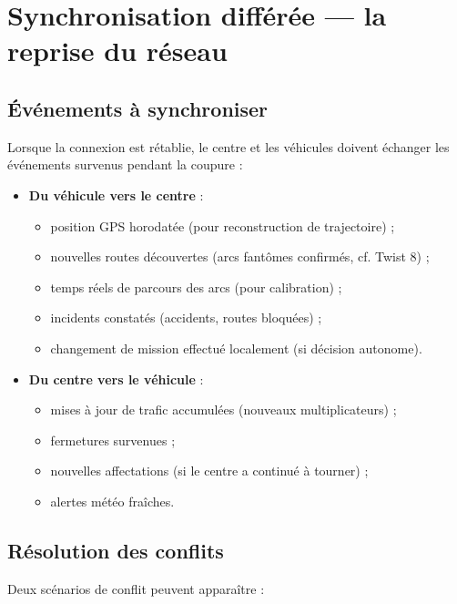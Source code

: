 \documentclass[12pt,a4paper]{article}
\theoremstyle{definition}
\theoremstyle{remark}
\begin{document}
\newpage

\section{Synchronisation différée — la reprise du réseau}

\subsection{Événements à synchroniser}

Lorsque la connexion est rétablie, le centre et les véhicules
doivent échanger les événements survenus pendant la coupure :

\begin{itemize}
  \item \textbf{Du véhicule vers le centre} :
    \begin{itemize}
      \item position GPS horodatée (pour reconstruction de trajectoire) ;
      \item nouvelles routes découvertes (arcs fantômes confirmés,
            cf. Twist 8) ;
      \item temps réels de parcours des arcs (pour calibration) ;
      \item incidents constatés (accidents, routes bloquées) ;
      \item changement de mission effectué localement (si décision autonome).
    \end{itemize}
  \item \textbf{Du centre vers le véhicule} :
    \begin{itemize}
      \item mises à jour de trafic accumulées (nouveaux multiplicateurs) ;
      \item fermetures survenues ;
      \item nouvelles affectations (si le centre a continué à tourner) ;
      \item alertes météo fraîches.
    \end{itemize}
\end{itemize}

\subsection{Résolution des conflits}

Deux scénarios de conflit peuvent apparaître :
\end{document}
